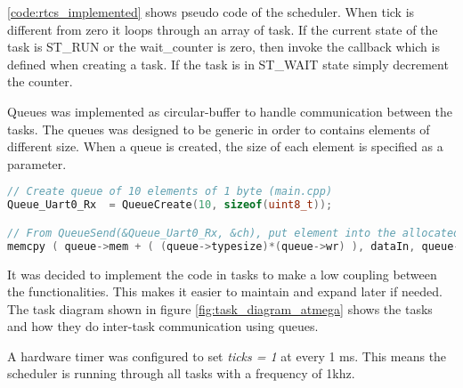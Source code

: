 \ref{code:rtcs_implemented} shows pseudo code of the scheduler. When tick is different from zero it loops through an array of task. If the current state of the task is ST\_RUN or the wait\_counter is zero, then invoke the callback which is defined when creating a task. If the task is in ST\_WAIT state simply decrement the counter.

Queues was implemented as circular-buffer to handle communication between the tasks. The queues was designed to be generic in order to contains elements of different size. When a queue is created, the size of each element is specified as a parameter.

\begin{lstlisting}[language = C++, caption = Implementation of queues. Notice the queues are generic in size since the size of the element is given as parameter. When a element is put into the queue\, it is done by multiplying the elements size by the index of the next element in the queue and add that to the beginning of the memory allocated for the queue, label=code:rtcs_queue]
// Create queue of 10 elements of 1 byte (main.cpp)
Queue_Uart0_Rx  = QueueCreate(10, sizeof(uint8_t));

// From QueueSend(&Queue_Uart0_Rx, &ch), put element into the allocated memory.
memcpy ( queue->mem + ( (queue->typesize)*(queue->wr) ), dataIn, queue->typesize );
\end{lstlisting}


It was decided to implement the code in tasks to make a low coupling between the functionalities. This makes it easier to maintain and expand later if needed. The task diagram shown in figure \ref{fig:task_diagram_atmega} shows the tasks and how they do inter-task communication using queues.

A hardware timer was configured to set \textit{ticks = 1} at every 1 ms. This means the scheduler is running through all tasks with a frequency of 1khz.

